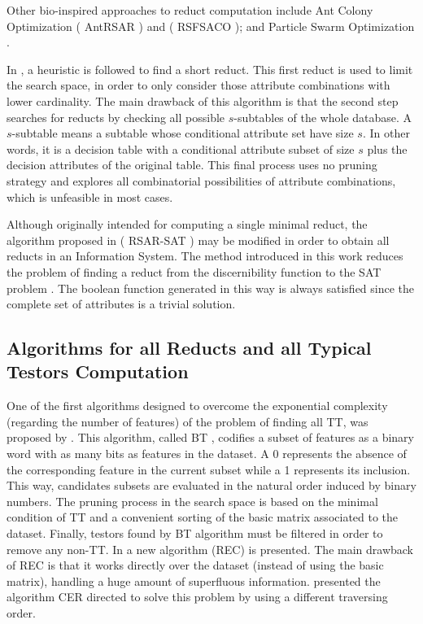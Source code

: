 \documentclass[authoryear,11pt]{elsarticle}
\makeatletter
\newcommand{\setword}[2]{%
  \phantomsection
  #1\def\@currentlabel{\unexpanded{#1}}\label{#2}%
}
\makeatother
\begin{document}
  Other bio-inspired approaches to reduct computation include Ant Colony Optimization \citep{Jensen03} 
  (\setword{AntRSAR}{AntRSAR}) and \citep{Chen10} (\setword{RSFSACO}{RSFSACO}); and Particle Swarm 
  Optimization \citep{Wang07}.
    
  In \citep{Lin04}, a heuristic is followed to find a short reduct. This first reduct is used to limit the search
  space, in order to only consider those attribute combinations with lower cardinality. 
  The main drawback of this algorithm is that the second step searches for reducts by checking all possible 
  $s$-subtables of the whole database. A $s$-subtable means a subtable whose conditional attribute set have 
  size $s$. In other words, it is a decision table with a conditional attribute subset of size $s$ plus the decision
  attributes of the original table. This final process uses no pruning strategy and explores all combinatorial
  possibilities of attribute combinations, which is unfeasible in most cases.
  
  Although originally intended for computing a single minimal reduct, the algorithm proposed in \linebreak 
  \citep{Jensen14}
  (\setword{RSAR-SAT}{RSARSAT}) may be modified in order to obtain all reducts in an Information System. 
  The method introduced in this work
  reduces the problem of finding a reduct from the discernibility function to the SAT problem \citep{Davis62}. 
  The boolean function generated in this way is always satisfied since the complete set of attributes is a trivial
  solution.
  
    
\subsection{Algorithms for all Reducts and all Typical Testors Computation}
  One of the first algorithms designed to overcome the exponential complexity (regarding
  the number of features) of the problem of finding all TT, was 
  proposed by \cite{Ruiz85}. This algorithm, called \setword{BT}{BT},
  codifies a subset of features as a binary word with as many bits as features in the 
  dataset. A 0 represents the absence of the corresponding feature in the current
  subset while a 1 represents its inclusion. This way, candidates subsets are evaluated
  in the natural order induced by binary numbers. The pruning process in the
  search space is based on the minimal condition of TT and a convenient sorting
  of the basic matrix associated to the dataset. Finally, 
  testors found by BT algorithm must be filtered in order to remove any non-TT.
  In \citep{Shulcloper95b} a new algorithm (REC) is presented.
  The main drawback of REC is that it works directly over the dataset (instead of using the
  basic matrix), handling a huge amount of superfluous information. \cite{Ayaquica97}
  presented the algorithm CER directed to solve this problem by using a different traversing
  order. 
	
\end{document}
